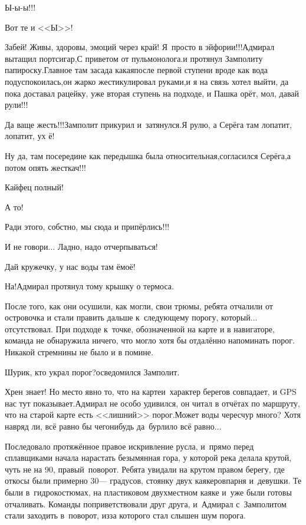 \diagdash Ы-ы-ы!!!

\diagdash Вот те и <<Ы>>!

\diagdash Забей! Живы, здоровы, эмоций через край! Я~просто в эйфории!!!\mdash Адмирал вытащил портсигар,\mdash С приветом от пульмонолога.\mdash и протянул Замполиту папироску.\mdash Главное там засада какая\mdash после первой ступени вроде как вода подуспокоилась,\mdash он жарко жестикулировал руками,\mdash и я на связь хотел выйти, да пока доставал рацейку, уже вторая ступень на подходе, и Пашка орёт, мол, давай рули!!!

\diagdash Да ваще жесть!!!\mdash Замполит прикурил и~затянулся.\mdash Я рулю, а Серёга там лопатит, лопатит, ух ё!

\diagdash Ну да, там посередине как передышка была относительная,\mdash согласился Серёга,\mdash а потом опять жесткач!!!

\diagdash Кайфец полный!

\diagdash А то!

\diagdash Ради этого, собстно, мы сюда и припёрлись!!!

\diagdash И не говори$\ldots$ Ладно, надо отчерпываться!

\diagdash Дай кружечку, у нас воды там ё\sdash моё!

\diagdash На!\mdash Адмирал протянул тому крышку о термоса.

После того, как они осушили, как могли, свои трюмы, ребята отчалили от островочка и стали править дальше к~следующему порогу, который... отсутствовал. При подходе к~точке, обозначенной на карте и в навигаторе, команда не обнаружила ничего, что могло хотя бы отдалённо напоминать порог. Никакой стремнины не было и в помине.

\diagdash Шурик, кто украл порог?\mdash осведомился Замполит. 

\diagdash Хрен знает! Но место явно то, что на карте\mdash и~характер берегов совпадает, и GPS нас тут показывает.\mdash Адмирал не особо удивился, он читал в отчётах по маршруту, что на старой карте есть <<лишний>> порог.\mdash Может воды чересчур много? Хотя навряд ли, всё равно бы чего\sdash нибудь да~бурлило всё равно$\ldots$

Последовало протяжённое правое искривление русла, и~прямо перед сплавщиками начала нарастать безымянная гора, у которой река делала крутой, чуть не на 90\degree, правый~поворот. Ребята увидали на крутом правом берегу, где откосы были примерно 30\thinspace\nobreakdash--- градусов, стоянку двух каякеров\mdash парня и~девушки. Те были в~гидрокостюмах, на пластиковом двухместном каяке и~уже были готовы отчаливать. Команды поприветствовали друг друга, и~Адмирал с~Замполитом стали заходить в~поворот, из\sdash за которого стал слышен шум порога.

